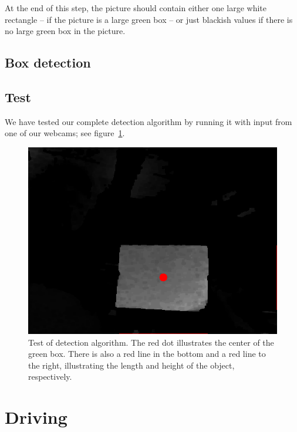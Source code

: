 \documentclass[a4paper,12pt]{article}
\begin{document}
At the end of this step, the picture should contain either one large white
rectangle -- if the picture is a large green box -- or just blackish values if
there is no large green box in the picture.


\subsection{Box detection}



\subsection{Test}

We have tested our complete detection algorithm by running it with input from
one of our webcams; see figure~\ref{fig:detect-test}.

\begin{figure}[h]
\includegraphics[width=.9\textwidth]{test.png}
\caption{Test of detection algorithm.  The red dot illustrates the center of the
green box.  There is also a red line in the bottom and a red line to the right,
illustrating the length and height of the object, respectively.}
\label{fig:detect-test}
\end{figure}

\section{Driving}
\end{document}
